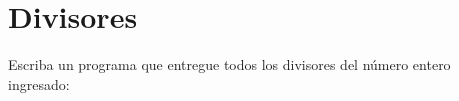 \section{Divisores}

Escriba un programa que entregue todos los divisores del número entero
ingresado:
